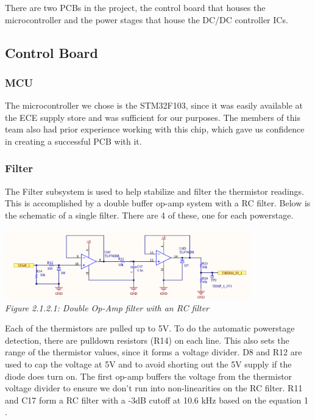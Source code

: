 There are two PCBs in the project, the control board that houses the microcontroller and the power stages that house the DC/DC controller ICs.

\subsection{Control Board}
\subsubsection{MCU}
The microcontroller we chose is the STM32F103, since it was easily available at the ECE supply store and was sufficient for our purposes.
The members of this team also had prior experience working with this chip, which gave us confidence in creating a successful PCB with it.

\subsubsection{Filter}
The Filter subsystem is used to help stabilize and filter the thermistor readings. This is accomplished by a double buffer op-amp system with a RC filter.
Below is the schematic of a single filter. There are 4 of these, one for each powerstage.

\begin{center}
    \includegraphics[width=0.8\textwidth]{images/op_amp_filter.png}\\
    \textit{Figure 2.1.2.1: Double Op-Amp filter with an RC filter}\\
\end{center}
\vspace{\baselineskip}

Each of the thermistors are pulled up to 5V. To do the automatic powerstage detection, there are pulldown resistors (R14) on each line.
This also sets the range of the thermistor values, since it forms a voltage divider. D8 and R12 are used to cap the voltage at 5V and to avoid shorting out the 5V supply if the diode does turn on.
The first op-amp buffers the voltage from the thermistor voltage divider to ensure we don’t run into non-linearities on the RC filter. R11 and C17 form a RC filter with a -3dB cutoff at 10.6 kHz based on the equation 1 \cite{ref7}.


